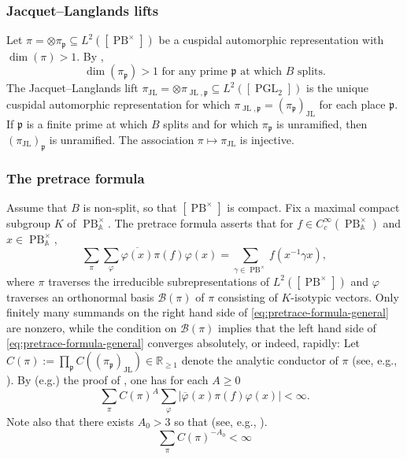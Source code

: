 \documentclass[reqno,10pt]{amsart}
\theoremstyle{plain} %
\theoremstyle{definition}
\theoremstyle{plain} %
\theoremstyle{remark}
\theoremstyle{itplain} %
\theoremstyle{remark} %
\renewcommand{\geq}{\geqslant}
\numberwithin{equation}{section}
\DeclareMathOperator{\JL}{JL}
\def\PB{\operatorname{PB}}
\def\PGL{\operatorname{PGL}}
\begin{document}
\subsubsection{Jacquet--Langlands lifts}
\label{sec-3-4-1}
Let $\pi = \otimes \pi_\mathfrak{p} \subseteq L^2([\PB^\times])$ be a cuspidal automorphic representation with $\dim(\pi) > 1$.  By \cite[Prop 4]{MR0333081},
\begin{equation}\label{eqn:generic-at-each-place-if-not-1-diml}
  \text{$\dim(\pi_\mathfrak{p}) > 1$ for any prime $\mathfrak{p}$ at
    which $B$ splits.}
\end{equation}
The Jacquet--Langlands lift $\pi_{\JL} = \otimes \pi_{\JL,\mathfrak{p}} \subseteq L^2([\PGL_2])$ is the unique  cuspidal automorphic representation for which $\pi_{\JL,\mathfrak{p}} = (\pi_\mathfrak{p})_{\JL}$ for each place $\mathfrak{p}$.  If $\mathfrak{p}$ is a finite prime at which $B$ splits and for which $\pi_\mathfrak{p}$ is unramified, then $(\pi_{\JL})_\mathfrak{p}$ is unramified.  The association $\pi \mapsto \pi_{\JL}$ is injective.


\subsubsection{The pretrace formula\label{sec:pretrace-formula}}
\label{sec-3-4-2}
Assume that $B$ is non-split, so that $[\PB^\times]$ is compact.  Fix a maximal compact subgroup $K$ of $\PB^\times_\mathbb{A}$.  The pretrace formula asserts that for $f \in C_c^\infty(\PB_\mathbb{A}^\times)$ and $x \in \PB^\times_\mathbb{A}$,
\begin{equation}\label{eq:pretrace-formula-general}
  \sum_{\pi}
  \sum_{\varphi}
  \overline{\varphi (x)}
  \pi(f) \varphi(x)
  = \sum_{\gamma \in \PB^\times} f(x^{-1} \gamma x),
\end{equation}
where $\pi$ traverses the irreducible subrepresentations of $L^2([\PB^\times])$ and $\varphi$ traverses an orthonormal basis $\mathcal{B}(\pi)$ of $\pi$ consisting of $K$-isotypic vectors.  Only finitely many summands on the right hand side of \eqref{eq:pretrace-formula-general} are nonzero, while the condition on $\mathcal{B}(\pi)$ implies that the left hand side of \eqref{eq:pretrace-formula-general} converges absolutely, or indeed, rapidly: Let $C(\pi) := \prod_\mathfrak{p} C((\pi_\mathfrak{p})_{\JL}) \in \mathbb{R}_{\geq 1}$ denote the analytic conductor of $\pi$ (see, e.g.,  \cite[\S3.1.8, \S4.1.4]{michel-2009}).  By (e.g.) the proof of \cite[Thm 9.1]{MR1616155}, one has for each $A \geq 0$
\begin{equation}\label{eq:rapid-convergence-of-pretrace-formula}
  \sum_{\pi} C(\pi)^A
  \sum_{\varphi}
  |\overline{\varphi}(x) \pi(f) \varphi(x)|
  < \infty.
\end{equation}
Note also that there exists $A_0 > 3$ so that (see, e.g., \cite[(2.15)]{michel-2009}).
\begin{equation}\label{eq:polynomial-growth-of-reps}
  \sum_{\pi} C(\pi)^{-A_0}
  < \infty
\end{equation}
\end{document}
